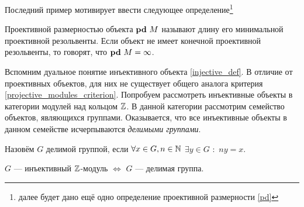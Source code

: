 \documentclass[../main.tex]{subfiles}
\begin{document}
Последний пример мотивирует ввести следующее определение\footnote{далее будет дано ещё одно определение проективной размерности \ref{pd}}
\begin{to_def}
Проективной размерностью объекта $\mathbf{pd}\text{ } M$ называют длину его минимальной проективной резольвенты. Если объект не имеет конечной проективной резольвенты, то говорят, что $\mathbf{pd}\text{ } M = \infty$.
\end{to_def}
Вспомним дуальное понятие инъективного объекта \ref{injective_def}. В отличие от проективных объектов, для них не существует общего аналога критерия \ref{projective_modules_criterion}. Попробуем рассмотреть инъективные объекты в категории модулей над кольцом $\mathbb{Z}$. В данной категории рассмотрим семейство объектов, являющихся группами. Оказывается, что все инъективные объекты в данном семействе исчерпываются \emph{делимыми группами}.
\begin{to_def}
Назовём $G$ делимой группой, если $\forall x\in G, n\in \mathbb{N}$ $\exists y\in G$ $\colon$ $ny = x$.
\end{to_def}
\begin{to_suj}
$G$ --- инъективный $\mathbb{Z}$-модуль $\iff$ $G$ --- делимая группа.
\end{to_suj}
\end{document}
